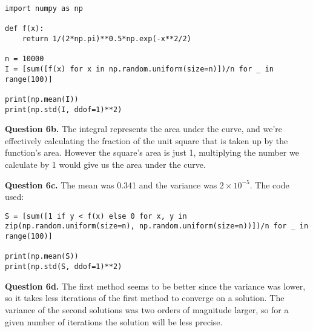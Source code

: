 \documentclass[letterpaper, reqno,11pt]{article}
\begin{document}
\begin{lstlisting}
import numpy as np

def f(x):
    return 1/(2*np.pi)**0.5*np.exp(-x**2/2)

n = 10000
I = [sum([f(x) for x in np.random.uniform(size=n)])/n for _ in range(100)]

print(np.mean(I))
print(np.std(I, ddof=1)**2)
\end{lstlisting}

{\medskip\noindent\bf Question 6b.} The integral represents the area under the curve, and we're effectively calculating the fraction of the unit square that is taken up by the function's area. However the square's area is just 1, multiplying the number we calculate by 1 would give us the area under the curve. 

{\medskip\noindent\bf Question 6c.} The mean was 0.341 and the variance was $2\times 10^{-5}$. The code used:

\begin{lstlisting}
S = [sum([1 if y < f(x) else 0 for x, y in zip(np.random.uniform(size=n), np.random.uniform(size=n))])/n for _ in range(100)]

print(np.mean(S))
print(np.std(S, ddof=1)**2)
\end{lstlisting}

{\medskip\noindent\bf Question 6d.} The first method seems to be better since the variance was lower, so it takes less iterations of the first method to converge on a solution. The variance of the second solutions was two orders of magnitude larger, so for a given number of iterations the solution will be less precise. 
\end{document}
